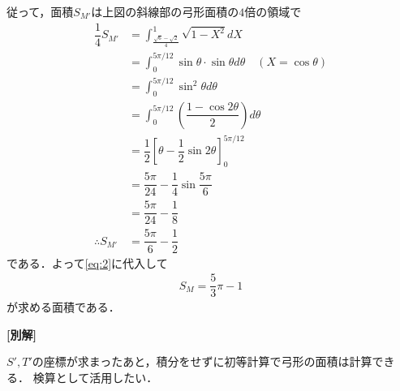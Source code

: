 \documentclass[../../main.tex]{subfiles}
\begin{document}
従って，面積$S_{M'}$は上図の斜線部の弓形面積の$4$倍の領域で
\begin{align}
  \dfrac{1}{4}S_{M'}
  &= \int_{\frac{\sqrt{6}-\sqrt{2}}{4}}^{1} \sqrt{1 - X^2} dX \\
  &= \int_{0}^{5\pi/12} \sin \theta \cdot \sin \theta d\theta \quad (X=\cos\theta) \\
  &= \int_{0}^{5\pi/12} \sin^2 \theta d\theta \\
  &= \int_{0}^{5\pi/12} \left(\dfrac{1-\cos 2\theta}{2}\right) d\theta \\
  &= \dfrac{1}{2}\left[\theta - \dfrac{1}{2}\sin 2\theta\right]_{0}^{5\pi/12} \\
  &= \dfrac{5\pi}{24} - \dfrac{1}{4}\sin \dfrac{5\pi}{6} \\
  &= \dfrac{5\pi}{24} - \dfrac{1}{8} \\
  \therefore
  S_{M'}
  &= \dfrac{5\pi}{6} - \dfrac{1}{2}
\end{align}
である．よって\cref{eq:2}に代入して
\begin{align}
  S_{M} = \dfrac{5}{3}\pi - 1
\end{align}
が求める面積である．

{\bf [別解]}

$S',T'$の座標が求まったあと，積分をせずに初等計算で弓形の面積は計算できる．
検算として活用したい．
\end{document}
